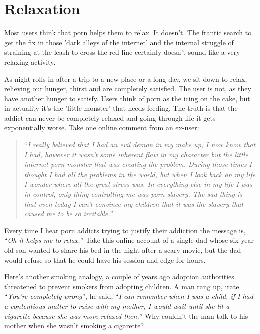 \documentclass[
]{book}
\begin{document}
\hypertarget{relaxation}{%
\section{Relaxation}\label{relaxation}}

Most users think that porn helps them to relax. It doesn't. The frantic search to get the fix in those 'dark alleys of the internet' and the internal struggle of straining at the leash to cross the red line certainly doesn't sound like a very relaxing activity.

As night rolls in after a trip to a new place or a long day, we sit down to relax, relieving our hunger, thirst and are completely satisfied. The user is not, as they have another hunger to satisfy. Users think of porn as the icing on the cake, but in actuality it's the 'little monster' that needs feeding. The truth is that the addict can never be completely relaxed and going through life it gets exponentially worse. Take one online comment from an ex-user:

\begin{quote}
``\emph{I really believed that I had an evil demon in my make up, I now know that I had, however it wasn't some inherent flaw in my character but the little internet porn monster that was creating the problem. During those times I thought I had all the problems in the world, but when I look back on my life I wonder where all the great stress was. In everything else in my life I was in control, only thing controlling me was porn slavery. The sad thing is that even today I can't convince my children that it was the slavery that caused me to be so irritable.}''
\end{quote}

Every time I hear porn addicts trying to justify their addiction the message is, ``\emph{Oh it helps me to relax.}'' Take this online account of a single dad whose six year old son wanted to share his bed in the night after a scary movie, but the dad would refuse so that he could have his session and edge for hours.

Here's another smoking analogy, a couple of years ago adoption authorities threatened to prevent smokers from adopting children. A man rang up, irate. ``\emph{You're completely wrong}'', he said, ``\emph{I can remember when I was a child, if I had a contentious matter to raise with my mother, I would wait until she lit a cigarette because she was more relaxed then.}'' Why couldn't the man talk to his mother when she wasn't smoking a cigarette?
\end{document}
